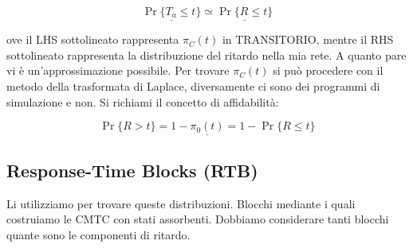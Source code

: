 \[
	\underline{\Pr\{T_a\leq t\}} \simeq \underline{\Pr\{R\leq t\}}
\]

ove il LHS sottolineato rappresenta $\pi_C(t)$ in TRANSITORIO, mentre il RHS sottolineato rappresenta la distribuzione del ritardo nella mia rete. A quanto pare vi è un'approssimazione possibile. Per trovare $\pi_C(t)$ si può procedere con il metodo della trasformata di Laplace, diversamente ci sono dei programmi di simulazione e non. Si richiami il concetto di affidabilità:

\[
	\Pr\{R>t\} = 1-\underline{\pi_0(t)} = 1-\Pr\{R\leq t\}
\]

\subsection{Response-Time Blocks (RTB)}

Li utilizziamo per trovare queste distribuzioni. Blocchi mediante i quali costruiamo le CMTC con stati assorbenti. Dobbiamo considerare tanti blocchi quante sono le componenti di ritardo.

